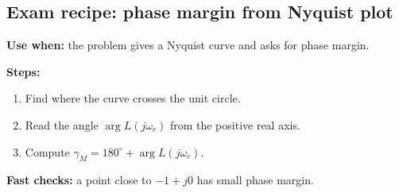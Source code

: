 \subsection{Exam recipe: phase margin from Nyquist plot}

\textbf{Use when:} the problem gives a Nyquist curve and asks for phase margin.

\textbf{Steps:}
\begin{enumerate}
\item Find where the curve crosses the unit circle.
\item Read the angle \(\arg L(j\omega_c)\) from the positive real axis.
\item Compute \(\gamma_M=180^\circ+\arg L(j\omega_c)\).
\end{enumerate}

\textbf{Fast checks:} a point close to \(-1+j0\) has small phase margin.
